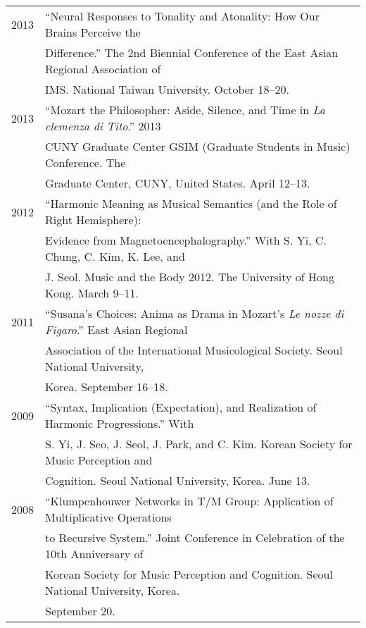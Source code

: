 \documentclass[a4,11pt,draft]{article}
\begin{document}
  \hspace*{-0.25cm}
  \begin{tabular}{p{2.5cm} p{12.5cm}}
  2013 & “Neural Responses to Tonality and Atonality: How Our Brains Perceive the\\
  & Difference.” The 2nd Biennial Conference of the East Asian Regional Association of\\
  & IMS. National Taiwan University. October 18–20.\\[2mm]

  2013 & “Mozart the Philosopher: Aside, Silence, and Time in \textit{La clemenza di Tito}.” 2013\\
  & CUNY Graduate Center GSIM (Graduate Students in Music) Conference. The\\
  & Graduate Center, CUNY, United States. April 12–13.\\[2mm]

  2012 & “Harmonic Meaning as Musical Semantics (and the Role of Right Hemisphere):\\
  & Evidence from Magnetoencephalography.” With S. Yi, C. Chung, C. Kim, K. Lee, and\\
  & J. Seol. Music and the Body 2012. The University of Hong Kong. March 9–11.\\[2mm]

  2011 & “Susana’s Choices: Anima as Drama in Mozart’s \textit{Le nozze di Figaro}.” East Asian Regional\\
  & Association of the International Musicological Society. Seoul National University,\\
  & Korea. September 16–18.\\[2mm]

  2009 & “Syntax, Implication (Expectation), and Realization of Harmonic Progressions.” With\\
  & S. Yi, J. Seo, J. Seol, J. Park, and C. Kim. Korean Society for Music Perception and\\
  & Cognition. Seoul National University, Korea. June 13.\\[2mm]

  2008 & “Klumpenhouwer Networks in T/M Group: Application of Multiplicative Operations\\
  & to Recursive System.” Joint Conference in Celebration of the 10th Anniversary of\\
  & Korean Society for Music Perception and Cognition. Seoul National University, Korea.\\
  & September 20.
  \end{tabular}
  
\end{document}
